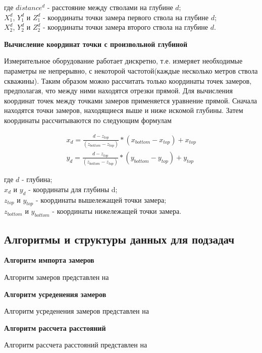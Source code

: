 где $ distance^d $ - расстояние между стволами на глубине $ d $;\\
$ X_1^d $, $ Y_1^d $ и $ Z_1^d $ - координаты точки замера первого ствола на глубине $ d $;\\
$ X_2^d $, $ Y_2^d $ и $ Z_2^d $ - координаты точки замера второго ствола на глубине $ d $.

\textbf{Вычисление координат точки с произвольной глубиной}

Измерительное оборудование работает дискретно, т.е. измеряет необходимые параметры не непрерывно, с некоторой частотой(каждые несколько метров
ствола скважины). Таким образом можно рассчитать только координаты точек замеров, предполагая, что между ними находятся отрезки прямой. Для вычисления
координат точек между точками замеров применяется уравнение прямой. Сначала находятся точки замеров, находящиеся выше и ниже искомой глубины. Затем
координаты рассчитываются по следующим формулам

\begin{equation}
  \begin{split}
    x_d = \frac{d-z_{top}}{(z_{bottom}-z_{top})}*(x_{bottom}-x_{top})+x_{top} \\
    y_d = \frac{d-z_{top}}{(z_{bottom}-z_{top})}*(y_{bottom}-y_{top})+y_{top}
  \end{split}
\end{equation}

где $ d $ - глубина;\\
$ x_d $ и $ y_d $ - координаты для глубины d; \\
$ z_{top} $ и $ y_{top} $ - координаты вышележащей точки замера;\\
$ z_{bottom} $ и $ y_{bottom} $ - координаты нижележащей точки замера.

\subsection{Алгоритмы и структуры данных для подзадач}

\textbf{Алгоритм импорта замеров}

Алгоритм  замеров представлен на 


\textbf{Алгоритм усреденения замеров}

Алгоритм усреденения замеров представлен на 


\textbf{Алгоритм рассчета расстояний}

Алгоритм рассчета расстояний представлен на 

